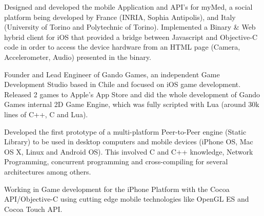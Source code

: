 \documentclass[10pt, a4paper, dvips]{moderncv}
\begin{document}
{
\begin{scriptsize}
Designed and developed the mobile Application and API's for myMed, a social platform being developed by France (INRIA, Sophia Antipolis), and Italy (University of Torino and Polytechnic of Torino).
Implemented a Binary \& Web hybrid client for iOS that provided a bridge between Javascript and Objective-C code in order to access the device hardware from an HTML page (Camera, Accelerometer,
Audio) presented in the binary.\\
\end{scriptsize}
}

{
\begin{scriptsize}
Founder and Lead Engineer of Gando Games, an independent Game Development Studio based in Chile and focused on iOS game development. Released 2 games to Apple's App Store and did the whole development of Gando Games internal 2D Game Engine, which was fully scripted with Lua (around 30k lines of C++, C and Lua).\\
\end{scriptsize}
}

{
\begin{scriptsize}
Developed the first prototype of a multi-platform Peer-to-Peer engine (Static Library) to be used in desktop computers and mobile devices (iPhone OS, Mac OS X, Linux and Android OS). This involved C and C++ knowledge, Network Programming, concurrent programming and cross-compiling for several architectures among others.\\
\end{scriptsize}
}

{
\begin{scriptsize}
Working in Game development for the iPhone Platform with the Cocoa API/Objective-C using cutting edge mobile technologies like OpenGL ES and Cocoa Touch API.\\
\end{scriptsize}
}
\end{document}
